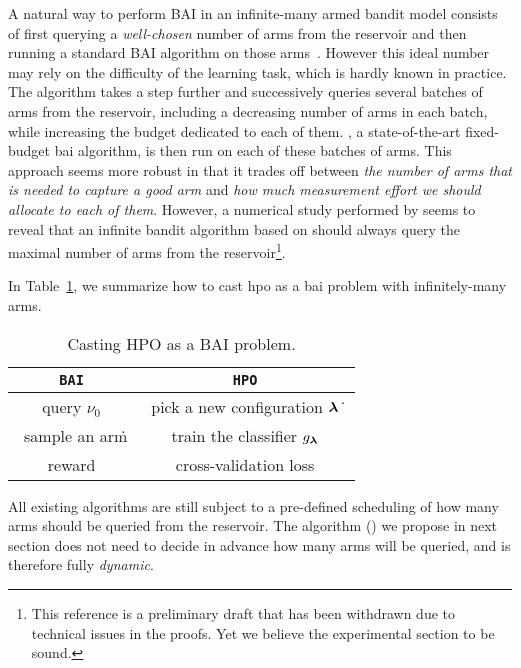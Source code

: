 A natural way to perform BAI in an infinite-many armed bandit model consists of first querying a \emph{well-chosen} number of arms from the reservoir and then running a standard BAI algorithm on those arms~\citep{carpentier2015siri}. However this ideal number may rely on the difficulty of the learning task, which is hardly known in practice. The \Hyperband{} algorithm \citep{li2017hyperband} takes a step further and successively queries several batches of arms from the reservoir, including a decreasing number of arms in each batch, while increasing the budget dedicated to each of them. \SHA \citep{karnin2013sha}, a state-of-the-art fixed-budget \gls{bai} algorithm, is then run on each of these batches of arms. This approach seems more robust in that it trades off between \emph{the number of arms that is needed to capture a good arm} and \emph{how much measurement effort we should allocate to each of them}. However, a numerical study performed by \cite{aziz2018infinite} seems to reveal that an infinite bandit algorithm based on \SHA should always query the maximal number of arms from the reservoir\footnote{This reference is a preliminary draft that has been withdrawn due to technical issues in the proofs. Yet we believe the experimental section to be sound.}. 

In Table~\ref{table:hpo}, we summarize how to cast \gls{hpo} as a \gls{bai} problem with infinitely-many arms.

\begin{table}[ht]
\centering
\def\arraystretch{1.5}
\begin{tabular}[r]{|c|c|} \hline
\textbf{\texttt{BAI}} & \textbf{\texttt{HPO}}\\
\hline
query $\nu_0$ & \ pick a new configuration ${\boldsymbol \lambda}$\.\ \\
\hline
\ sample an arm\. & train the classifier $g_{{\boldsymbol \lambda}}$ \\
\hline
reward & cross-validation loss \\
\hline
\end{tabular}
\caption{Casting HPO as a BAI problem.}
\label{table:hpo}
\end{table}


All existing algorithms are still subject to a pre-defined scheduling of how many arms should be queried from the reservoir. The algorithm (\DTTTS) we propose in next section does not need to decide in advance how many arms will be queried, and is therefore fully \emph{dynamic}. %

